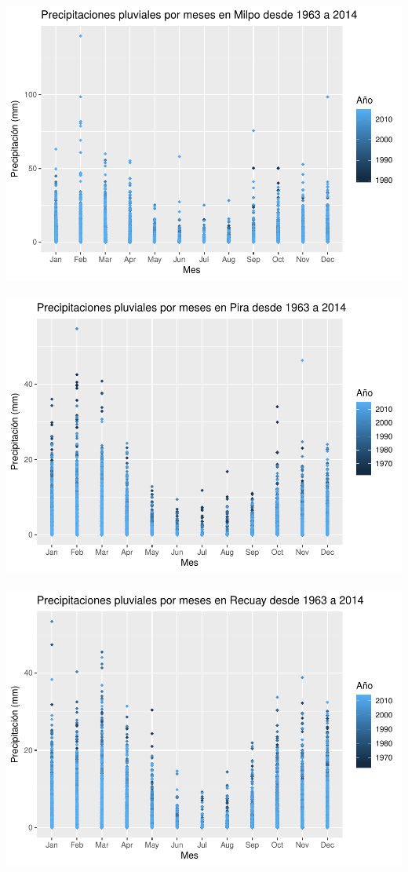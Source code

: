 \documentclass{article}
\begin{document}
\includegraphics[width=\textwidth]{proyecto_files/unnamed-chunk-5-1.pdf}\\\\
\includegraphics[width=\textwidth]{proyecto_files/unnamed-chunk-5-2.pdf}\\\\
\includegraphics[width=\textwidth]{proyecto_files/unnamed-chunk-5-3.pdf}\\\\
\end{document}
